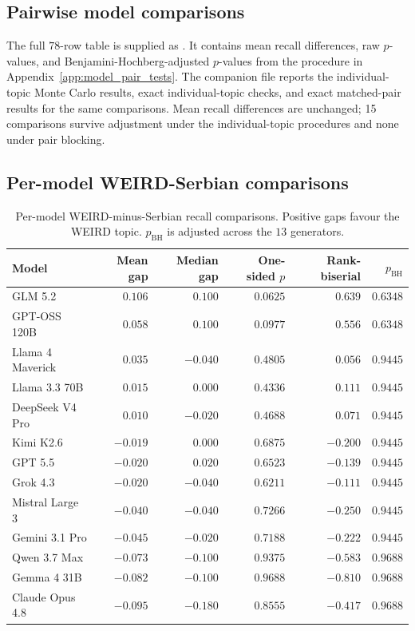 \documentclass[11pt,a4paper]{article}
\begin{document}
\subsection{Pairwise model comparisons}
\label{app:pairwise_results}

The full $78$-row table is supplied as . It contains mean recall differences, raw $p$-values, and Benjamini-Hochberg-adjusted $p$-values from the procedure in Appendix~\ref{app:model_pair_tests}. The companion file  reports the individual-topic Monte Carlo results, exact individual-topic checks, and exact matched-pair results for the same comparisons. Mean recall differences are unchanged; 15 comparisons survive adjustment under the individual-topic procedures and none under pair blocking.

\subsection{Per-model WEIRD-Serbian comparisons}
\label{app:per_model_results}
\begin{table}[t]
\centering
\small
\caption{Per-model WEIRD-minus-Serbian recall comparisons.
Positive gaps favour the WEIRD topic.
$p_{\mathrm{BH}}$ is adjusted across the $13$ generators.}
\label{tab:per_model_weird_gap}

\begin{tabular}{lrrrrr}
\toprule
\textbf{Model} &
\textbf{Mean gap} &
\textbf{Median gap} &
\textbf{One-sided $p$} &
\textbf{Rank-biserial} &
\textbf{$p_{\mathrm{BH}}$} \\
\midrule
GLM 5.2 & $0.106$ & $0.100$ & $0.0625$ & $0.639$ & $0.6348$ \\
GPT-OSS 120B & $0.058$ & $0.100$ & $0.0977$ & $0.556$ & $0.6348$ \\
Llama 4 Maverick & $0.035$ & $-0.040$ & $0.4805$ & $0.056$ & $0.9445$ \\
Llama 3.3 70B & $0.015$ & $0.000$ & $0.4336$ & $0.111$ & $0.9445$ \\
DeepSeek V4 Pro & $0.010$ & $-0.020$ & $0.4688$ & $0.071$ & $0.9445$ \\
Kimi K2.6 & $-0.019$ & $0.000$ & $0.6875$ & $-0.200$ & $0.9445$ \\
GPT 5.5 & $-0.020$ & $0.020$ & $0.6523$ & $-0.139$ & $0.9445$ \\
Grok 4.3 & $-0.020$ & $-0.040$ & $0.6211$ & $-0.111$ & $0.9445$ \\
Mistral Large 3 & $-0.040$ & $-0.040$ & $0.7266$ & $-0.250$ & $0.9445$ \\
Gemini 3.1 Pro & $-0.045$ & $-0.020$ & $0.7188$ & $-0.222$ & $0.9445$ \\
Qwen 3.7 Max & $-0.073$ & $-0.100$ & $0.9375$ & $-0.583$ & $0.9688$ \\
Gemma 4 31B & $-0.082$ & $-0.100$ & $0.9688$ & $-0.810$ & $0.9688$ \\
Claude Opus 4.8 & $-0.095$ & $-0.180$ & $0.8555$ & $-0.417$ & $0.9688$ \\
\bottomrule
\end{tabular}
\end{table}
\end{document}
